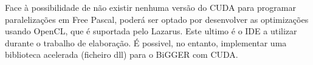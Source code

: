 Face à possibilidade de não existir nenhuma versão do CUDA para programar paralelizações em Free Pascal, poderá ser optado por desenvolver as optimizações usando OpenCL, que é suportada pelo Lazarus. Este ultimo é o IDE a utilizar durante o trabalho de elaboração. É possivel, no entanto, implementar uma biblioteca acelerada (ficheiro dll) para o BiGGER com CUDA.


